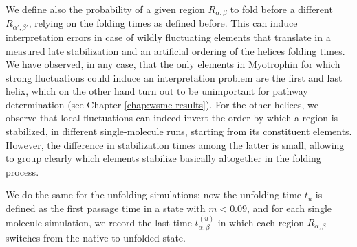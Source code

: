 We define also the probability of a given region $R_{\alpha,\beta}$ to fold
before a different $R_{\alpha',\beta'}$, relying on the folding times as defined
before.
This can induce interpretation errors in case of wildly fluctuating elements
that translate in a measured late stabilization and an artificial ordering of
the helices folding times.
We have observed, in any case, that the
only elements in Myotrophin for which strong  fluctuations could induce an
interpretation
problem are the first and last helix, which on the other hand turn out to be
unimportant for pathway determination (see Chapter \ref{chap:wsme-results}). For the
other helices, we observe that local fluctuations can indeed invert the order by
which a region is stabilized,  in different single-molecule runs, starting from
its constituent elements. 
However, the difference in stabilization times among
the latter is small, allowing to group clearly which elements stabilize
basically altogether in the folding process.

We do the same for the unfolding simulations: now the unfolding time $t_u$ is
defined as the first passage time in a state with $m<0.09$, and for each single
molecule simulation, we record the last time $t_{\alpha,\beta}^{(u)}$ in which
each region $R_{\alpha,\beta}$ switches from the native to unfolded state.


